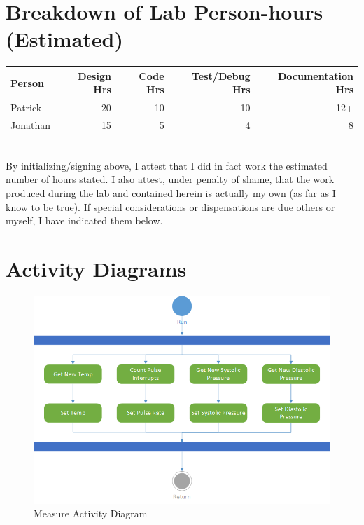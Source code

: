 \documentclass[12pt]{article} %
\begin{document}
    \pagebreak
    \appendix

    \section{Breakdown of Lab Person-hours (Estimated)}

    \begin{tabular}{|l|*{4}{r|}}
      \hline
      Person & Design Hrs & Code Hrs & Test/Debug Hrs & Documentation Hrs \\ \hline
      Patrick & 20 & 10 & 10 & 12+  \\ \hline
      Jonathan & 15 & 5 & 4 & 8  \\ \hline
    \end{tabular}

    ~\\

    By initializing/signing above, I attest that I did in fact work the
    estimated number of hours stated. I also attest, under penalty of shame,
    that the work produced during the lab and contained herein is actually my
    own (as far as I know to be true). If special considerations or
    dispensations are due others or myself, I have indicated them below.

    \pagebreak

    \section{Activity Diagrams}

    \begin{figure}
      \centering
      \includegraphics[width=\textwidth]{../design/measure_activity.png}
      \caption{Measure Activity Diagram}
      \label{fig:measureActivity}
    \end{figure}
\end{document}
